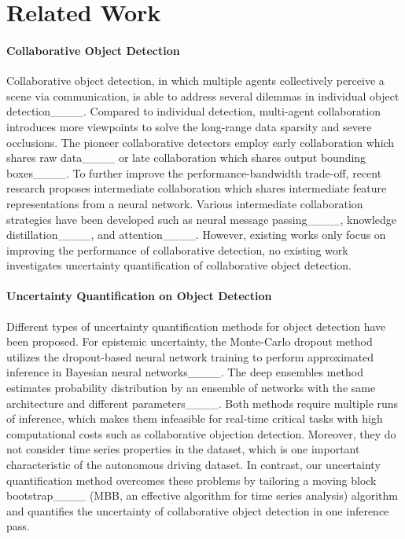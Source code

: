 \section{Related Work}
\label{sec:relatedwork}

\paragraph{Collaborative Object Detection} Collaborative object detection, in which multiple agents collectively perceive a scene via communication, is able to address several dilemmas in individual object detection____. Compared to individual detection, multi-agent collaboration introduces more viewpoints to solve the long-range data sparsity and severe occlusions.
The pioneer collaborative detectors employ early collaboration which shares raw data____ or late collaboration which shares output bounding boxes____. To further improve the performance-bandwidth trade-off, recent research proposes intermediate collaboration which shares intermediate feature representations from a neural network. Various intermediate collaboration strategies have been developed such as neural message passing____, knowledge distillation____, and attention____. However, existing works only focus on improving the performance of collaborative detection, no existing work investigates uncertainty quantification of collaborative object detection. 

\paragraph{Uncertainty Quantification on Object Detection} 
Different types of uncertainty quantification methods for object detection have been proposed. For epistemic uncertainty, the Monte-Carlo dropout method utilizes the dropout-based neural network training to perform approximated inference in Bayesian neural networks____. The deep ensembles method estimates probability distribution by an ensemble of networks with the same architecture and different parameters____. Both methods require multiple runs of inference, which makes them infeasible for real-time critical tasks with high computational costs such as collaborative objection detection. Moreover, they do not consider time series properties in the dataset, which is one important characteristic of the autonomous driving dataset. In contrast, our uncertainty quantification method overcomes these problems by tailoring a moving block bootstrap____ (MBB, an effective algorithm for time series analysis) algorithm and quantifies the uncertainty of collaborative object detection in one inference pass.

